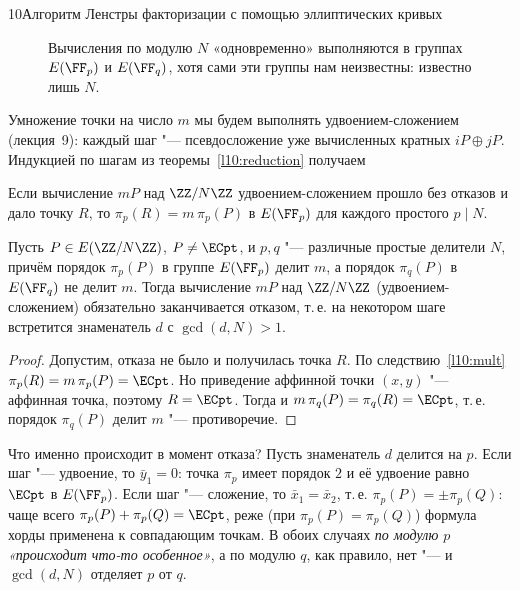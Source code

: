 \begin{lecture}{10}{Алгоритм Ленстры факторизации с помощью эллиптических кривых}
\begin{figure}[ht]
\centering
{}
\caption{Вычисления по модулю $N$ «одновременно» выполняются в группах $E(\FF_p)$ и $E(\FF_q)$,
хотя сами эти группы нам неизвестны: известно лишь $N$.}
\label{l10:fig-crt}
\end{figure}

Умножение точки на число $m$ мы будем выполнять удвоением-сложением (лекция~9): каждый шаг
"--- псевдосложение уже вычисленных кратных $iP \oplus jP$. Индукцией по шагам из
теоремы~\ref{l10:reduction} получаем

\begin{corollary}\label{l10:mult}
Если вычисление $mP$ над $\ZZ/N\ZZ$ удвоением-сложением прошло без отказов и дало точку $R$,
то $\pi_p(R) = m\,\pi_p(P)$ в $E(\FF_p)$ для каждого простого $p \mid N$.
\end{corollary}

\begin{theorem}\label{l10:main}
Пусть $P \in E(\ZZ/N\ZZ)$, $P \ne \ECpt$, и $p, q$ "--- различные простые делители $N$, причём
порядок $\pi_p(P)$ в группе $E(\FF_p)$ делит $m$, а порядок $\pi_q(P)$ в $E(\FF_q)$ не делит $m$.
Тогда вычисление $mP$ над $\ZZ/N\ZZ$ (удвоением-сложением) обязательно заканчивается отказом,
т.\,е. на некотором шаге встретится знаменатель $d$ с $\gcd(d, N) > 1$.
\end{theorem}

\begin{proof}
Допустим, отказа не было и получилась точка $R$. По следствию~\ref{l10:mult}
$\pi_p(R) = m\,\pi_p(P) = \ECpt$. Но приведение аффинной точки $(x, y)$ "--- аффинная точка,
поэтому $R = \ECpt$. Тогда и $m\,\pi_q(P) = \pi_q(R) = \ECpt$, т.\,е. порядок $\pi_q(P)$ делит
$m$ "--- противоречие.
\end{proof}

Что именно происходит в момент отказа? Пусть знаменатель $d$ делится на $p$. Если шаг "---
удвоение, то $\bar y_1 = 0$: точка $\pi_p$ имеет порядок $2$ и её удвоение равно $\ECpt$ в
$E(\FF_p)$. Если шаг "--- сложение, то $\bar x_1 = \bar x_2$, т.\,е. $\pi_p(P) = \pm\pi_p(Q)$:
чаще всего $\pi_p(P) + \pi_p(Q) = \ECpt$, реже (при $\pi_p(P) = \pi_p(Q)$) формула хорды
применена к совпадающим точкам. В обоих случаях \emph{по модулю $p$ «происходит что-то
особенное»}, а по модулю $q$, как правило, нет "--- и $\gcd(d, N)$ отделяет $p$ от $q$.


\end{lecture}

